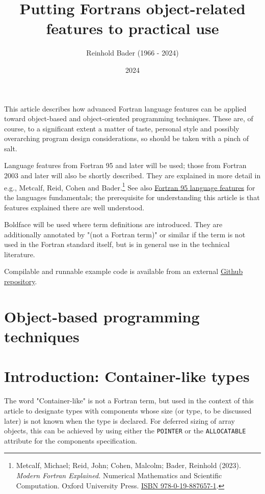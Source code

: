 \documentclass[
]{scrartcl}
\title{Putting Fortran\textquotesingle s object-related features to
practical use}
\author{Reinhold Bader (1966 - 2024)}
\date{2024}
\begin{document}
\maketitle

This article describes how advanced Fortran language features can be
applied toward object-based and object-oriented programming techniques.
These are, of course, to a significant extent a matter of taste,
personal style and possibly overarching program design considerations,
so should be taken with a pinch of salt.

Language features from Fortran 95 and later will be used; those from
Fortran 2003 and later will also be shortly described. They are
explained in more detail in e.g., Metcalf, Reid, Cohen and
Bader.\footnote{Metcalf, Michael; Reid, John; Cohen, Malcolm; Bader,
  Reinhold (2023). \emph{Modern Fortran Explained.} Numerical
  Mathematics and Scientific Computation. Oxford University Press.
  \href{https://en.wikipedia.org/wiki/Special:BookSources/978-0-19-887657-1}{ISBN
  978-0-19-887657-1}.} See also
\href{https://en.wikipedia.org/wiki/Fortran_95_language_features}{Fortran
95 language features} for the language\textquotesingle s fundamentals;
the prerequisite for understanding this article is that features
explained there are well understood.

Boldface will be used where term definitions are introduced. They are
additionally annotated by "(not a Fortran term)" or similar if the term
is not used in the Fortran standard itself, but is in general use in the
technical literature.

Compilable and runnable example code is available from an external
\href{https://github.com/reinh-bader/object_fortran}{Github repository}.

\section{Object-based programming
techniques}\label{object-based-programming-techniques}

\section{Introduction: Container-like
types}\label{introduction-container-like-types}

The word "Container-like" is not a Fortran term, but used in the context
of this article to designate types with components whose size (or type,
to be discussed later) is not known when the type is declared. For
deferred sizing of array objects, this can be achieved by using either
the \texttt{POINTER} or the \texttt{ALLOCATABLE} attribute for the
component\textquotesingle s specification.
\end{document}

